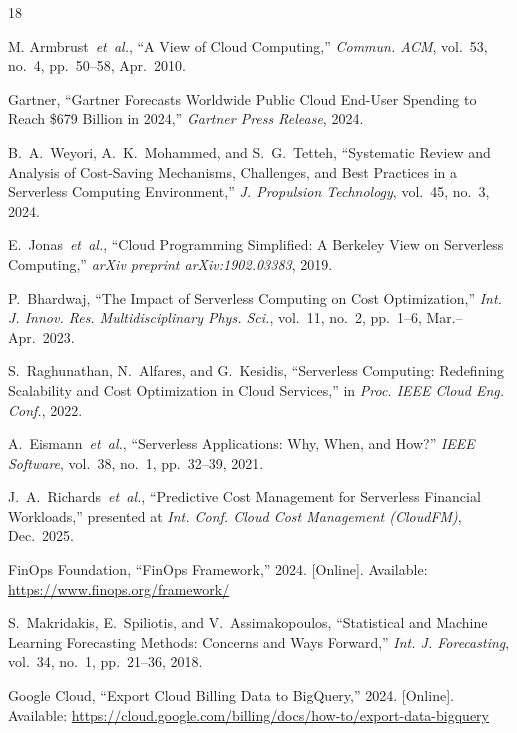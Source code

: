 \documentclass[conference]{IEEEtran}
\begin{document}
\begin{thebibliography}{18}

M. Armbrust~\textit{et~al.}, ``A View of Cloud Computing,'' \textit{Commun. ACM}, vol.~53, no.~4, pp.~50--58, Apr.~2010.

Gartner, ``Gartner Forecasts Worldwide Public Cloud End-User Spending to Reach \$679 Billion in 2024,'' \textit{Gartner Press Release}, 2024.

B.~A.~Weyori, A.~K.~Mohammed, and S.~G.~Tetteh, ``Systematic Review and Analysis of Cost-Saving Mechanisms, Challenges, and Best Practices in a Serverless Computing Environment,'' \textit{J. Propulsion Technology}, vol.~45, no.~3, 2024.

E.~Jonas~\textit{et~al.}, ``Cloud Programming Simplified: A Berkeley View on Serverless Computing,'' \textit{arXiv preprint arXiv:1902.03383}, 2019.

P.~Bhardwaj, ``The Impact of Serverless Computing on Cost Optimization,'' \textit{Int. J. Innov. Res. Multidisciplinary Phys. Sci.}, vol.~11, no.~2, pp.~1--6, Mar.--Apr.~2023.

S.~Raghunathan, N.~Alfares, and G.~Kesidis, ``Serverless Computing: Redefining Scalability and Cost Optimization in Cloud Services,'' in \textit{Proc. IEEE Cloud Eng. Conf.}, 2022.

A.~Eismann~\textit{et~al.}, ``Serverless Applications: Why, When, and How?'' \textit{IEEE Software}, vol.~38, no.~1, pp.~32--39, 2021.

J.~A.~Richards~\textit{et~al.}, ``Predictive Cost Management for Serverless Financial Workloads,'' presented at \textit{Int. Conf. Cloud Cost Management (CloudFM)}, Dec.~2025.

FinOps Foundation, ``FinOps Framework,'' 2024. [Online]. Available: \url{https://www.finops.org/framework/}

S.~Makridakis, E.~Spiliotis, and V.~Assimakopoulos, ``Statistical and Machine Learning Forecasting Methods: Concerns and Ways Forward,'' \textit{Int. J. Forecasting}, vol.~34, no.~1, pp.~21--36, 2018.

Google Cloud, ``Export Cloud Billing Data to BigQuery,'' 2024. [Online]. Available: \url{https://cloud.google.com/billing/docs/how-to/export-data-bigquery}


\end{thebibliography}
\end{document}
